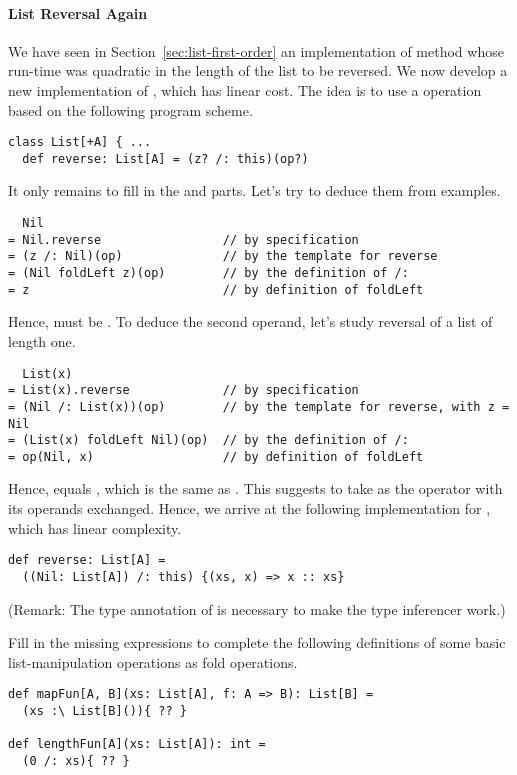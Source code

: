\paragraph{List Reversal Again} We have seen in 
Section~\ref{sec:list-first-order} an implementation of method
 whose run-time was quadratic in the length of the list
to be reversed. We now develop a new implementation of ,
which has linear cost.  The idea is to use a 
operation based on the following program scheme.
\begin{lstlisting}
class List[+A] { ...
  def reverse: List[A] = (z? /: this)(op?)
\end{lstlisting}
It only remains to fill in the  and  parts.  Let's
try to deduce them from examples.
\begin{lstlisting}
  Nil
= Nil.reverse                 // by specification
= (z /: Nil)(op)              // by the template for reverse
= (Nil foldLeft z)(op)        // by the definition of /:
= z                           // by definition of foldLeft
\end{lstlisting}
Hence,  must be . To deduce the second operand,
let's study reversal of a list of length one.
\begin{lstlisting}
  List(x)
= List(x).reverse             // by specification
= (Nil /: List(x))(op)        // by the template for reverse, with z = Nil
= (List(x) foldLeft Nil)(op)  // by the definition of /:
= op(Nil, x)                  // by definition of foldLeft
\end{lstlisting}
Hence,  equals , which is the same
as . This suggests to take as  the
\code{::} operator with its operands exchanged.  Hence, we arrive at
the following implementation for , which has linear complexity.
\begin{lstlisting}
def reverse: List[A] =
  ((Nil: List[A]) /: this) {(xs, x) => x :: xs}
\end{lstlisting}
(Remark: The type annotation of  is necessary 
to make the type inferencer work.)

\begin{exercise} Fill in the missing expressions to complete the following
definitions of some basic list-manipulation operations as fold
operations.
\begin{lstlisting}
def mapFun[A, B](xs: List[A], f: A => B): List[B] =
  (xs :\ List[B]()){ ?? }

def lengthFun[A](xs: List[A]): int =
  (0 /: xs){ ?? }
\end{lstlisting}
\end{exercise}

